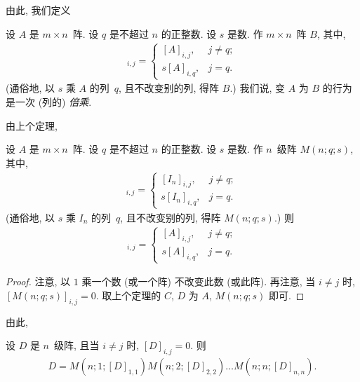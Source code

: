 \documentclass[../libro.tex]{subfiles}
\begin{document}
由此, 我们定义

\begin{definition}
    设 \(A\) 是 \(m \times n\)~阵.
    设 \(q\) 是不超过 \(n\) 的正整数.
    设 \(s\) 是数.
    作 \(m \times n\)~阵 \(B\), 其中,
    \begin{align*}
        [B]_{i,j} =
        \begin{cases}
            [A]_{i,j},   & j \neq q; \\
            s [A]_{i,q}, & j = q.
        \end{cases}
    \end{align*}
    (通俗地, 以 \(s\) 乘 \(A\) 的列~\(q\),
    且不改变别的列, 得阵 \(B\).)
    我们说, 变 \(A\) 为 \(B\) 的行为是一次
    (列的) \emph{倍乘}.
\end{definition}

由上个定理,

\begin{theorem}
    设 \(A\) 是 \(m \times n\)~阵.
    设 \(q\) 是不超过 \(n\) 的正整数.
    设 \(s\) 是数.
    作 \(n\)~级阵 \(M(n; q; s)\), 其中,
    \begin{align*}
        [M(n; q; s)]_{i,j} =
        \begin{cases}
            [I_n]_{i,j},   & j \neq q; \\
            s [I_n]_{i,q}, & j = q.
        \end{cases}
    \end{align*}
    (通俗地, 以 \(s\) 乘 \(I_n\) 的列~\(q\),
    且不改变别的列, 得阵 \(M(n; q; s)\).)
    则
    \begin{align*}
        [A M(n; q; s)]_{i,j} =
        \begin{cases}
            [A]_{i,j},   & j \neq q; \\
            s [A]_{i,q}, & j = q.
        \end{cases}
    \end{align*}
\end{theorem}

\begin{proof}
    注意, 以 \(1\) 乘一个数 (或一个阵) 不改变此数 (或此阵).
    再注意, 当 \(i \neq j\) 时,
    \([M(n; q; s)]_{i,j} = 0\).
    取上个定理的 \(C\), \(D\)
    为 \(A\), \(M(n; q; s)\) 即可.
\end{proof}

由此,

\begin{theorem}
    设 \(D\) 是 \(n\)~级阵,
    且当 \(i \neq j\) 时, \([D]_{i,j} = 0\).
    则
    \begin{align*}
        D =
        M(n; 1; [D]_{1,1})
        M(n; 2; [D]_{2,2})
        \dots
        M(n; n; [D]_{n,n}).
    \end{align*}
\end{theorem}
\end{document}
